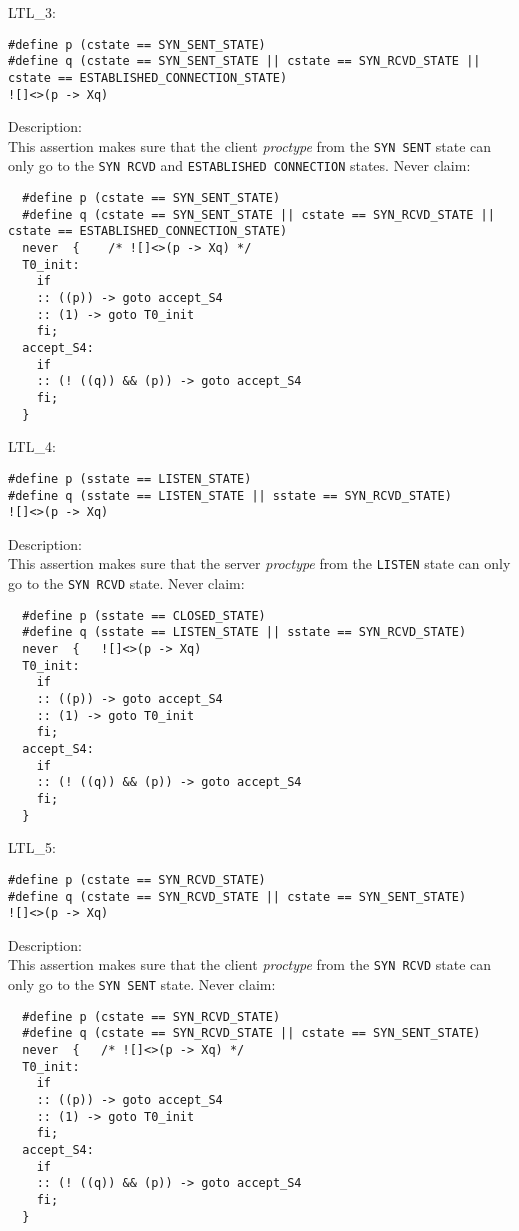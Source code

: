 \documentclass{WigReport}
\begin{document}
LTL\_3:\\
\begin{lstlisting}
#define p (cstate == SYN_SENT_STATE)
#define q (cstate == SYN_SENT_STATE || cstate == SYN_RCVD_STATE || cstate == ESTABLISHED_CONNECTION_STATE)
![]<>(p -> Xq)
\end{lstlisting}
Description:\\
This assertion makes sure that the client \textit{proctype} from the \verb|SYN SENT| state can only go to the \verb|SYN RCVD| and \verb|ESTABLISHED CONNECTION| states.
Never claim:\\
\begin{lstlisting}
  #define p (cstate == SYN_SENT_STATE)
  #define q (cstate == SYN_SENT_STATE || cstate == SYN_RCVD_STATE || cstate == ESTABLISHED_CONNECTION_STATE)
  never  {    /* ![]<>(p -> Xq) */
  T0_init:
    if
    :: ((p)) -> goto accept_S4
    :: (1) -> goto T0_init
    fi;
  accept_S4:
    if
    :: (! ((q)) && (p)) -> goto accept_S4
    fi;
  }
\end{lstlisting}


LTL\_4:\\
\begin{lstlisting}
#define p (sstate == LISTEN_STATE)
#define q (sstate == LISTEN_STATE || sstate == SYN_RCVD_STATE)
![]<>(p -> Xq)
\end{lstlisting}
Description:\\
This assertion makes sure that the server \textit{proctype} from the
\verb|LISTEN| state can only go to the \verb|SYN RCVD| state.
Never claim:\\
\begin{lstlisting}
  #define p (sstate == CLOSED_STATE)
  #define q (sstate == LISTEN_STATE || sstate == SYN_RCVD_STATE)
  never  {   ![]<>(p -> Xq)
  T0_init:
    if
    :: ((p)) -> goto accept_S4
    :: (1) -> goto T0_init
    fi;
  accept_S4:
    if
    :: (! ((q)) && (p)) -> goto accept_S4
    fi;
  }
\end{lstlisting}


LTL\_5:\\
\begin{lstlisting}
#define p (cstate == SYN_RCVD_STATE)
#define q (cstate == SYN_RCVD_STATE || cstate == SYN_SENT_STATE)
![]<>(p -> Xq)
\end{lstlisting}
Description:\\
This assertion makes sure that the client \textit{proctype} from the \verb|SYN RCVD| state can only go to the \verb|SYN SENT| state.
Never claim:\\
\begin{lstlisting}
  #define p (cstate == SYN_RCVD_STATE)
  #define q (cstate == SYN_RCVD_STATE || cstate == SYN_SENT_STATE)
  never  {   /* ![]<>(p -> Xq) */
  T0_init:
    if
    :: ((p)) -> goto accept_S4
    :: (1) -> goto T0_init
    fi;
  accept_S4:
    if
    :: (! ((q)) && (p)) -> goto accept_S4
    fi;
  }
\end{lstlisting}
\end{document}
